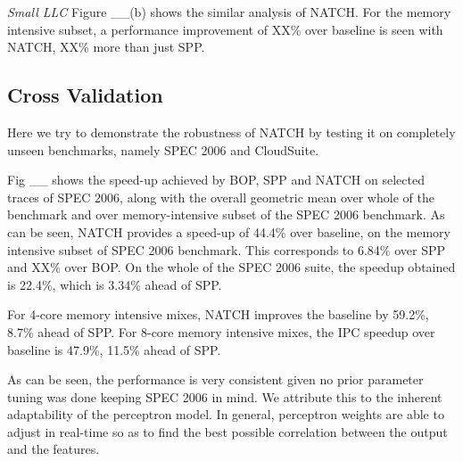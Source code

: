 \textit{Small LLC}
Figure \_\_(b) shows the similar analysis of NATCH.
For the memory intensive subset, a performance improvement of XX\% 
over baseline is seen with NATCH, XX\% more than just SPP.


\subsection{Cross Validation}
\label{Results-CrossVal}
Here we try to demonstrate the robustness of NATCH by testing it on
completely unseen benchmarks, namely SPEC 2006 and CloudSuite.

Fig \_\_ shows the speed-up achieved by BOP, SPP and NATCH on
selected traces of SPEC 2006, along with the overall geometric mean
over whole of the benchmark and over memory-intensive subset of the
SPEC 2006 benchmark.  As can be seen, NATCH provides a speed-up of
44.4\% over baseline, on the memory intensive subset of SPEC 2006
benchmark.  This corresponds to 6.84\% over SPP and XX\% over BOP.  On
the whole of the SPEC 2006 suite, the speedup obtained is 22.4\%,
which is 3.34\% ahead of SPP.

For 4-core memory intensive mixes, NATCH improves the baseline by 59.2\%, 
8.7\% ahead of SPP. For 8-core memory intensive mixes, the IPC speedup 
over baseline is 47.9\%, 11.5\% ahead of SPP. 

As can be seen, the performance is very consistent given no prior
parameter tuning was done keeping SPEC 2006 in mind.  We attribute
this to the inherent adaptability of the perceptron model.  In
general, perceptron weights are able to adjust in real-time so as to
find the best possible correlation between the output and the
features.
